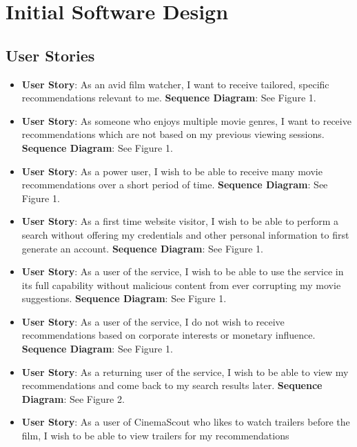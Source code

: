 \documentclass{article}
\begin{document}
\section{Initial Software Design}
\subsection{User Stories}
\begin{itemize}
\item \textbf{User Story}: As an avid film watcher, I want to receive 
tailored, specific recommendations relevant to me.
\newline\textbf{Sequence Diagram}: See Figure 1.
\item \textbf{User Story}: As someone who enjoys multiple movie genres, I want
to receive recommendations which are not based on my previous viewing sessions.
\newline\textbf{Sequence Diagram}: See Figure 1.
\item \textbf{User Story}: As a power user, I wish to be able to receive many 
movie recommendations over a short period of time.
\newline\textbf{Sequence Diagram}: See Figure 1.
\item \textbf{User Story}: As a first time website visitor, I wish to be able 
to perform a search without offering my credentials and other personal
information to first generate an account.
\newline\textbf{Sequence Diagram}: See Figure 1.
\item \textbf{User Story}: As a user of the service, I wish to be able to use 
the service in its full capability without malicious content from ever 
corrupting my movie suggestions.
\newline\textbf{Sequence Diagram}: See Figure 1.
\item \textbf{User Story}: As a user of the service, I do not wish to receive
recommendations based on corporate interests or monetary influence.
\newline\textbf{Sequence Diagram}: See Figure 1.
\item \textbf{User Story}: As a returning user of the service, I wish to be able
to view my recommendations and come back to my search results later.
\newline\textbf{Sequence Diagram}: See Figure 2.
\item \textbf{User Story}: As a user of CinemaScout who likes to watch trailers
before the film, I wish to be able to view trailers for my recommendations

\end{itemize}
\end{document}
